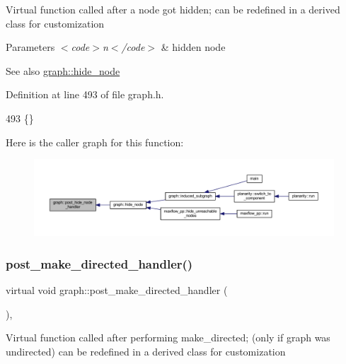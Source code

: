 Virtual function called after a node got hidden; can be redefined in a derived class for customization


\begin{DoxyParams}{Parameters}
{\em $<$code$>$n$<$/code$>$} & hidden node \\
\hline
\end{DoxyParams}
\begin{DoxySeeAlso}{See also}
\mbox{\hyperlink{classgraph_a214618b5e3c02695779350532506e225}{graph\+::hide\+\_\+node}} 
\end{DoxySeeAlso}


Definition at line 493 of file graph.\+h.


\begin{DoxyCode}
493 \{\}         
\end{DoxyCode}
Here is the caller graph for this function\+:
\nopagebreak
\begin{figure}[H]
\begin{center}
\leavevmode
\includegraphics[width=350pt]{classgraph_a50cb72a1e81d0a3d68965a1e6070edb3_icgraph}
\end{center}
\end{figure}
\mbox{\label{classgraph_a43dc35def3d8125eb8f3841d55e0b1c8}} 
\subsubsection{\texorpdfstring{post\+\_\+make\+\_\+directed\+\_\+handler()}{post\_make\_directed\_handler()}}
{\footnotesize\ttfamily virtual void graph\+::post\+\_\+make\+\_\+directed\+\_\+handler (\begin{DoxyParamCaption}{ }\end{DoxyParamCaption})\hspace{0.3cm}{\ttfamily [inline]}, {\ttfamily [virtual]}}

Virtual function called after performing make\+\_\+directed; (only if graph was undirected) can be redefined in a derived class for customization


